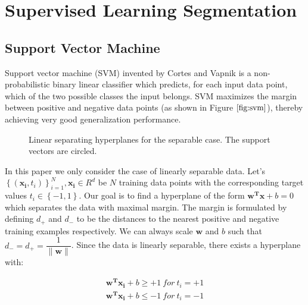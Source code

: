 \documentclass{SMBV12}
\begin{document}
\section{Supervised Learning Segmentation}

\subsection{Support Vector Machine}
\label{sec:svm}

Support vector machine (SVM) invented by Cortes and Vapnik \cite{cortes1995support} is a non-probabilistic binary linear classifier which predicts, for each input data point, which of the two possible classes the input belongs. SVM maximizes the margin between positive and negative data points (as shown in Figure $\ref{fig:svm}$), thereby achieving very good generalization performance.

\begin{figure}[htbp]
    \centering
    \caption{Linear separating hyperplanes for the separable case. The support vectors are circled.}
\end{figure}

In this paper we only consider the case of linearly separable data. Let's $\left\lbrace (\mathbf{x_i}, t_i)\right\rbrace _{i=1}^N, \mathbf{x_i} \in R^d$ be $N$ training data points with the corresponding target values $t_i \in \left\lbrace -1, 1\right\rbrace $. Our goal is to find a hyperplane of the form $\mathbf{w^T x} + b = 0$ which separates the data with maximal margin. The margin is formulated by defining $d_+$ and $d_-$ to be the distances to the nearest positive and negative training examples respectively. We can always scale $\mathbf{w}$ and $b$ such that $d_- = d_+ = \dfrac{1}{\|\mathbf{w}\|}$. Since the data is linearly separable, there exists a
hyperplane with:

\begin{equation}
	\begin{array}{lcl}
	\mathbf{w^T x_i} + b \geq +1\ for\ t_i = +1\\
	\mathbf{w^T x_i} + b \leq -1\ for\ t_i = -1
	\end{array}
\end{equation}
\end{document}
